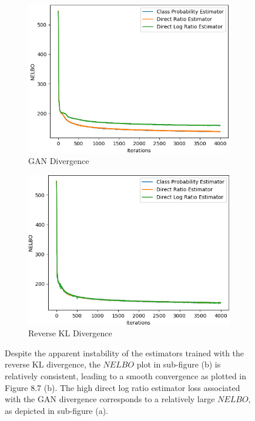 \documentclass[honours,12pt, twoside]{unswthesis}
\numberwithin{equation}{section}
\theoremstyle{definition}
\begin{document}
\begin{figure}[h!]
\centering
\begin{subfigure}{0.49\textwidth}
\includegraphics[width=\linewidth]{part3nelbos/PCADVvsPCADVexpvsPCADVgudlog.png}
\caption{GAN Divergence}
\end{subfigure}
\begin{subfigure}{0.49\textwidth}
\includegraphics[width=\linewidth]{part3nelbos/PCKLDvsPCKLexpvsPCKLgudlog.png}
\caption{Reverse KL Divergence}
\end{subfigure}
\caption{\small Despite the apparent instability of the estimators trained with the reverse KL divergence, the $NELBO$ plot in sub-figure (b) is relatively consistent, leading to a smooth convergence as plotted in Figure 8.7 (b). The high direct log ratio estimator loss associated with the GAN divergence corresponds to a relatively large $NELBO$, as depicted in sub-figure (a).}
\end{figure}
\newpage
\end{document}
